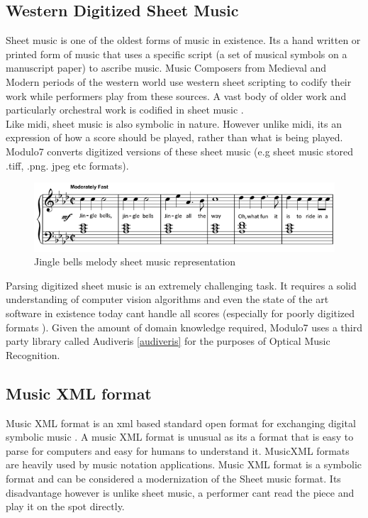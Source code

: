 \subsection{Western Digitized Sheet Music} \label{digitizedsheet}
\noindent Sheet music is one of the oldest forms of music in existence. Its a hand written or printed form of music that uses a specific script (a set of musical symbols on a manuscript paper) to ascribe music. Music Composers from Medieval and Modern periods of the western world use western sheet scripting to codify their work while performers play from these sources. A vast body of older work and particularly orchestral work is codified in sheet music \cite{theorytreatise}. \\

\noindent Like midi, sheet music is also symbolic in nature. However unlike midi, its an expression of how a score should be played, rather than what is being played. Modulo7 converts digitized versions of these sheet music (e.g sheet music stored .tiff, .png. jpeg etc formats). \\

\begin{figure}
\centering
\includegraphics[width=\textwidth]{jingle-bells-sheet-music-piano.png}
\makeatletter
\let\@currsize\normalsize
\caption{Jingle bells melody sheet music representation	}
\label{fig:sheet music example}
\end{figure}

\noindent Parsing digitized sheet music is an extremely challenging task. It requires a solid understanding of computer vision algorithms and even the state of the art software in existence today cant handle all scores (especially for poorly digitized formats \cite{gamera}). Given the amount of domain knowledge required, Modulo7 uses a third party library called Audiveris \ref{audiveris} for the purposes of Optical Music Recognition. 

\subsection{Music XML format}
\noindent Music XML format is an xml based standard open format for exchanging digital symbolic music \cite{musicxmlspecification}. A music XML format is unusual as its a format that is easy to parse for computers and easy for humans to understand it. MusicXML formats are heavily used by music notation applications. Music XML format is a symbolic format and can be considered a modernization of the Sheet music format. Its disadvantage however is unlike sheet music, a performer cant read the piece and play it on the spot directly. \\

